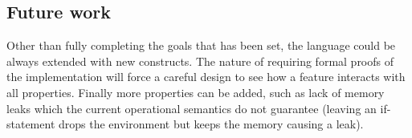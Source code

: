 \subsection{Future work}

Other than fully completing the goals that has been set, the language could be always extended with new constructs. The nature of requiring formal proofs of the implementation will force a careful design to see how a feature interacts with all properties. Finally more properties can be added, such as lack of memory leaks which the current operational semantics do not guarantee (leaving an if-statement drops the environment but keeps the memory causing a leak).
